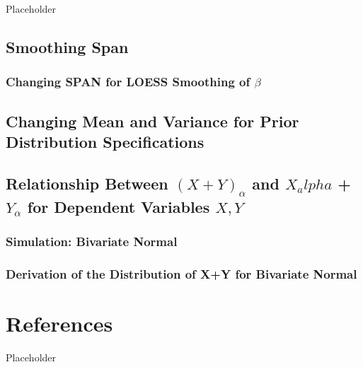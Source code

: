 \documentclass[12pt,twoside]{smiththesis}
\begin{document}
Placeholder

\hypertarget{smoothing-span}{%
\section{Smoothing Span}\label{smoothing-span}}

\hypertarget{changing-span-for-loess-smoothing-of-beta}{%
\subsection{\texorpdfstring{Changing SPAN for LOESS Smoothing of \(\beta\)}{Changing SPAN for LOESS Smoothing of \textbackslash beta}}\label{changing-span-for-loess-smoothing-of-beta}}

\hypertarget{changing-mean-and-variance-for-prior-distribution-specifications}{%
\section{Changing Mean and Variance for Prior Distribution Specifications}\label{changing-mean-and-variance-for-prior-distribution-specifications}}

\hypertarget{relationship-between-xy_alpha-and-x_alpha-y_alpha-for-dependent-variables-xy}{%
\section{\texorpdfstring{Relationship Between \((X+Y)_\alpha\) and \(X_alpha\) +\(Y_\alpha\) for Dependent Variables \(X,Y\)}{Relationship Between (X+Y)\_\textbackslash alpha and X\_alpha +Y\_\textbackslash alpha for Dependent Variables X,Y}}\label{relationship-between-xy_alpha-and-x_alpha-y_alpha-for-dependent-variables-xy}}

\hypertarget{simulation-bivariate-normal}{%
\subsection{Simulation: Bivariate Normal}\label{simulation-bivariate-normal}}

\hypertarget{conservativeintervals}{%
\subsection{Derivation of the Distribution of X+Y for Bivariate Normal}\label{conservativeintervals}}

\hypertarget{references}{%
\chapter*{References}\label{references}}

Placeholder


\end{document}

